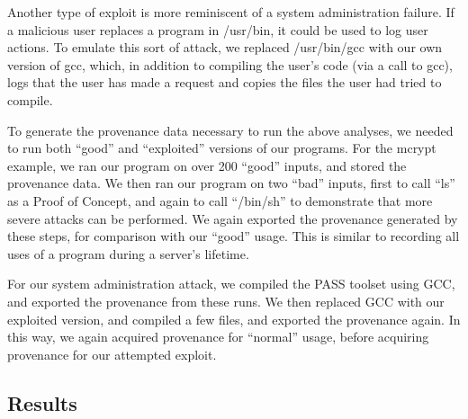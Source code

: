 \documentclass[10pt,twocolumn]{article}
\begin{document}
Another type of exploit is more reminiscent of a system administration failure. If a malicious user replaces a program in /usr/bin, it could be used to log user actions. To emulate this sort of attack, we replaced /usr/bin/gcc with our own version of gcc, which, in addition to compiling the user’s code (via a call to gcc), logs that the user has made a request and copies the files the user had tried to compile. 

To generate the provenance data necessary to run the above analyses, we needed to run both “good” and “exploited” versions of our programs. For the mcrypt example, we ran our program on over 200 “good” inputs, and stored the provenance data. We then ran our program on two “bad” inputs, first to call “ls” as a Proof of Concept, and again to call “/bin/sh” to demonstrate that more severe attacks can be performed. We again exported the provenance generated by these steps, for comparison with our “good” usage. This is similar to recording all uses of a program during a server’s lifetime. 

For our system administration attack, we compiled the PASS toolset using GCC, and exported the provenance from these runs. We then replaced GCC with our exploited version, and compiled a few files, and exported the provenance again. In this way, we again acquired provenance for “normal” usage, before acquiring provenance for our attempted exploit. 


\subsection{Results}
\end{document}
